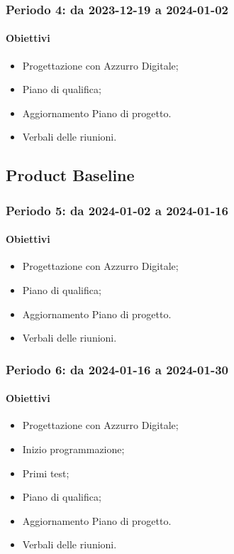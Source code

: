 \documentclass[10pt, a4paper]{article}
\begin{document}
{{{{{{{{\subsubsection{Periodo 4: da 2023-12-19 a 2024-01-02}
\paragraph{Obiettivi}
\begin{itemize}
    \item Progettazione con Azzurro Digitale;
    \item Piano di qualifica;
    \item Aggiornamento Piano di progetto.
    \item Verbali delle riunioni.
\end{itemize}
\subsection{Product Baseline}

\subsubsection{Periodo 5: da 2024-01-02 a 2024-01-16}
\paragraph{Obiettivi}
\begin{itemize}
    \item Progettazione con Azzurro Digitale;
    \item Piano di qualifica;
    \item Aggiornamento Piano di progetto.
    \item Verbali delle riunioni.
\end{itemize}

\subsubsection{Periodo 6: da 2024-01-16 a 2024-01-30}
\paragraph{Obiettivi}
\begin{itemize}
    \item Progettazione con Azzurro Digitale;
    \item Inizio programmazione;
    \item Primi test;
    \item Piano di qualifica;
    \item Aggiornamento Piano di progetto.
    \item Verbali delle riunioni.
\end{itemize}

}}}}}}}}
\end{document}
